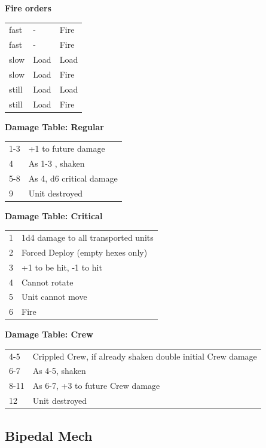 \documentclass[a4paper,12pt]{article}
\begin{document}
\noindent\textbf{Fire orders}

\begin{tabular}{lll}
fast & - & Fire \\
fast & - & Fire \\
slow & Load & Load \\
slow & Load & Fire \\
still & Load & Load \\
still & Load & Fire \\
\end{tabular}
\vspace{1ex}


\noindent\textbf{Damage Table: Regular}

\begin{tabular}{@{}lp{}@{}}
1-3 & +1 to future damage \\
4 & As 1-3 , shaken \\
5-8 & As 4, d6 critical damage \\
9 & Unit destroyed \\
\end{tabular}
\vspace{1ex}

\noindent\textbf{Damage Table: Critical}

\begin{tabular}{@{}lp{}@{}}
1 & 1d4 damage to all transported units \\
2 & Forced Deploy (empty hexes only) \\
3 & +1 to be hit, -1 to hit \\
4 & Cannot rotate \\
5 & Unit cannot move \\
6 & Fire \\
\end{tabular}
\vspace{1ex}

\noindent\textbf{Damage Table: Crew}

\begin{tabular}{@{}lp{}@{}}
4-5 & Crippled Crew, if already shaken double initial Crew damage \\
6-7 & As 4-5, shaken \\
8-11 & As 6-7, +3 to future Crew damage \\
12 & Unit destroyed \\
\end{tabular}
\vspace{1ex}
\subsection{Bipedal Mech}
\label{unit-bipedal-mech}
\end{document}
